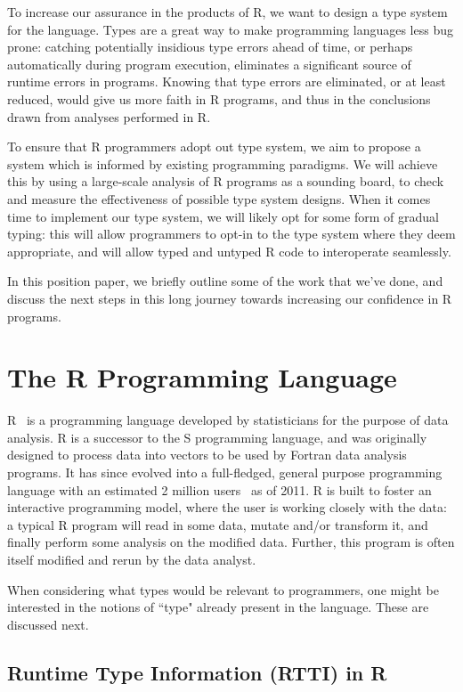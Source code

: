 \documentclass[sigplan,10pt,review]{acmart}\settopmatter{printfolios=true,printccs=false,printacmref=false}
\begin{document}
To increase our assurance in the products of R, we want to design a type system for the language.
Types are a great way to make programming languages less bug prone:
catching potentially insidious type errors ahead of time, or perhaps automatically during program execution, eliminates a significant source of runtime errors in programs.
Knowing that type errors are eliminated, or at least reduced, would give us more faith in R programs, and thus in the conclusions drawn from analyses performed in R.

To ensure that R programmers adopt out type system, we aim to propose a system which is informed by existing programming paradigms.
We will achieve this by using a large-scale analysis of R programs as a sounding board, to check and measure the effectiveness of possible type system designs.
When it comes time to implement our type system, we will likely opt for some form of gradual typing:
this will allow programmers to opt-in to the type system where they deem appropriate, and will allow typed and untyped R code to interoperate seamlessly.

In this position paper, we briefly outline some of the work that we've done, and discuss the next steps in this long journey towards increasing our confidence in R programs.

%
%
%
%
\section{The R Programming Language}

R~\cite{R_man} is a programming language developed by statisticians for the purpose of data analysis.
R is a successor to the S programming language, and was originally designed to process data into vectors to be used by Fortran data analysis programs.
It has since evolved into a full-fledged, general purpose programming language with an estimated 2 million users~\cite{eco11} as of 2011.
R is built to foster an interactive programming model, where the user is working closely with the data:
a typical R program will read in some data, mutate and/or transform it, and finally perform some analysis on the modified data.
Further, this program is often itself modified and rerun by the data analyst.

When considering what types would be relevant to programmers, one might be interested in the notions of ``type" already present in the language.
These are discussed next.

%
%
\subsection{Runtime Type Information (RTTI) in R}
\end{document}
